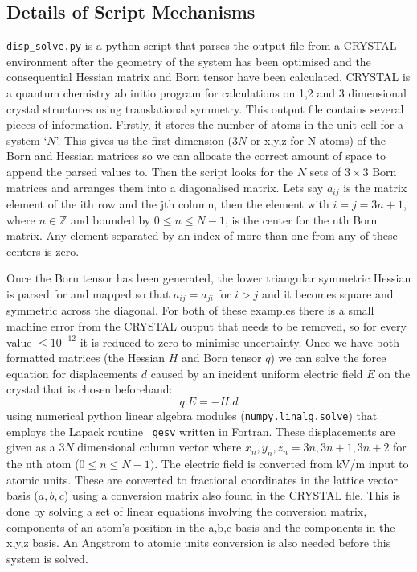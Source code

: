 \subsection{Details of Script Mechanisms}

\texttt{disp\_solve.py} is a python script that parses the output file from a CRYSTAL environment after the geometry of the system has been optimised and the consequential Hessian matrix and Born tensor have been calculated. CRYSTAL is a quantum chemistry ab initio program for calculations on 1,2 and 3 dimensional crystal structures using translational symmetry. This output file contains several pieces of information. Firstly, it stores the number of atoms in the unit cell for a system `$N$'. This gives us the first dimension ($3N$ or x,y,z for N atoms) of the Born and Hessian matrices so we can allocate the correct amount of space to append the parsed values to. Then the script looks for the $N$ sets of $3\times3$ Born matrices and arranges them into a diagonalised matrix. Lets say $a_{ij}$ is the matrix element of the ith row and the jth column, then the element with $i = j = 3n+1$, where $n \in \mathbb{Z}$ and bounded by $0 \leq n \leq N-1$, is the center for the nth Born matrix. Any element separated by an index of more than one from any of these centers is zero.

Once the Born tensor has been generated, the lower triangular symmetric Hessian is parsed for and mapped so that $a_{ij} = a_{ji}$ for $i > j$ and it becomes square and symmetric across the diagonal. For both of these examples there is a small machine error from the CRYSTAL output that needs to be removed, so for every value $\leq 10^{-12}$ it is reduced to zero to minimise uncertainty. Once we have both formatted matrices (the Hessian $H$ and Born tensor $q$) we can solve the force equation for displacements $d$ caused by an incident uniform electric field $E$ on the crystal that is chosen beforehand:
\begin{equation*}
q.E = -H.d
\end{equation*}
using numerical python linear algebra modules (\texttt{numpy.linalg.solve}) that employs the Lapack routine \texttt{\_gesv} written in Fortran. These displacements are given as a $3N$ dimensional column vector where $x_n,y_n,z_n = 3n, 3n+1, 3n+2$ for the nth atom ($0\leq n \leq N-1)$. The electric field is converted from kV/m input to atomic units. These are converted to fractional coordinates in the lattice vector basis ($a,b,c$) using a conversion matrix also found in the CRYSTAL file. This is done by solving a set of linear equations involving the conversion matrix, components of an atom's position in the a,b,c basis and the components in the x,y,z basis. An Angstrom to atomic units conversion is also needed before this system is solved.

